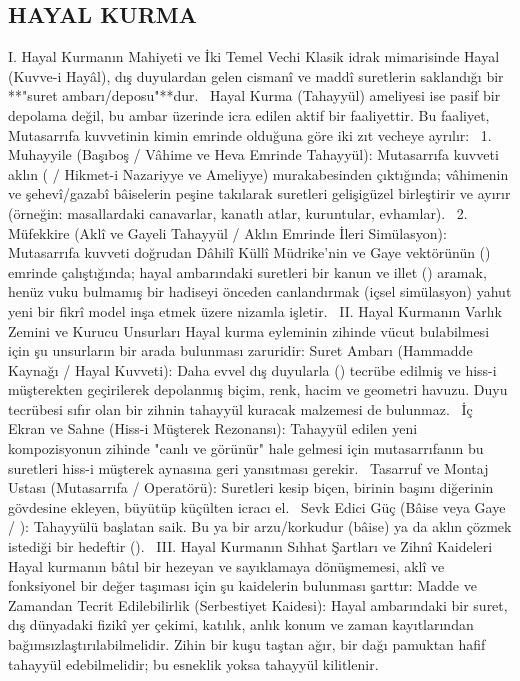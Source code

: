 \documentclass[11pt,a4paper]{article}
\begin{document}
\subsection{HAYAL KURMA}


I. Hayal Kurmanın Mahiyeti ve İki Temel Vechi
Klasik idrak mimarisinde Hayal (Kuvve-i Hayâl), dış duyulardan gelen cismanî ve maddî suretlerin saklandığı bir **"suret ambarı/deposu"**dur.  
Hayal Kurma (Tahayyül) ameliyesi ise pasif bir depolama değil, bu ambar üzerinde icra edilen aktif bir faaliyettir. Bu faaliyet, Mutasarrıfa kuvvetinin kimin emrinde olduğuna göre iki zıt vecheye ayrılır:  
1. Muhayyile (Başıboş / Vâhime ve Heva Emrinde Tahayyül):
Mutasarrıfa kuvveti aklın ( / Hikmet-i Nazariyye ve Ameliyye) murakabesinden çıktığında; vâhimenin ve şehevî/gazabî bâiselerin peşine takılarak suretleri gelişigüzel birleştirir ve ayırır (örneğin: masallardaki canavarlar, kanatlı atlar, kuruntular, evhamlar).  
2. Müfekkire (Aklî ve Gayeli Tahayyül / Aklın Emrinde İleri Simülasyon):
Mutasarrıfa kuvveti doğrudan Dâhilî Küllî Müdrike'nin ve Gaye vektörünün () emrinde çalıştığında; hayal ambarındaki suretleri bir kanun ve illet () aramak, henüz vuku bulmamış bir hadiseyi önceden canlandırmak (içsel simülasyon) yahut yeni bir fikrî model inşa etmek üzere nizamla işletir.  
II. Hayal Kurmanın Varlık Zemini ve Kurucu Unsurları
Hayal kurma eyleminin zihinde vücut bulabilmesi için şu unsurların bir arada bulunması zaruridir:
 Suret Ambarı (Hammadde Kaynağı / Hayal Kuvveti):
Daha evvel dış duyularla () tecrübe edilmiş ve hiss-i müşterekten geçirilerek depolanmış biçim, renk, hacim ve geometri havuzu. Duyu tecrübesi sıfır olan bir zihnin tahayyül kuracak malzemesi de bulunmaz.  
 İç Ekran ve Sahne (Hiss-i Müşterek Rezonansı):
Tahayyül edilen yeni kompozisyonun zihinde "canlı ve görünür" hale gelmesi için mutasarrıfanın bu suretleri hiss-i müşterek aynasına geri yansıtması gerekir.  
 Tasarruf ve Montaj Ustası (Mutasarrıfa /  Operatörü):
Suretleri kesip biçen, birinin başını diğerinin gövdesine ekleyen, büyütüp küçülten icracı el.  
 Sevk Edici Güç (Bâise veya Gaye / ):
Tahayyülü başlatan saik. Bu ya bir arzu/korkudur (bâise) ya da aklın çözmek istediği bir hedeftir ().  
III. Hayal Kurmanın Sıhhat Şartları ve Zihnî Kaideleri
Hayal kurmanın bâtıl bir hezeyan ve sayıklamaya dönüşmemesi, aklî ve fonksiyonel bir değer taşıması için şu kaidelerin bulunması şarttır:
 Madde ve Zamandan Tecrit Edilebilirlik (Serbestiyet Kaidesi):
Hayal ambarındaki bir suret, dış dünyadaki fizikî yer çekimi, katılık, anlık konum ve zaman kayıtlarından bağımsızlaştırılabilmelidir. Zihin bir kuşu taştan ağır, bir dağı pamuktan hafif tahayyül edebilmelidir; bu esneklik yoksa tahayyül kilitlenir.  
\end{document}

